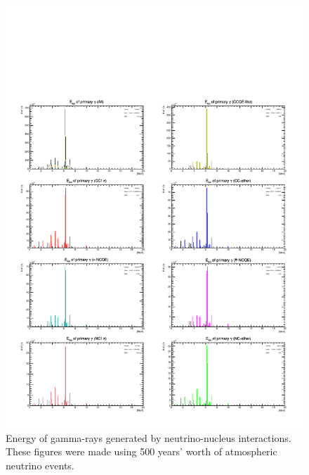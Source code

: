 \begin{figure}[h]
	\centering
	\includegraphics[width=16cm]{PDF/NEUT/s1_2_official/gamma/EnePri}
	\caption[Energy of gamma-rays generated by neutrino-nucleus interactions]{
	Energy of gamma-rays generated by neutrino-nucleus interactions.
	These figures were made using 500 years' worth of atmospheric neutrino events.
	}\label{gammaEnePri}
\end{figure}

